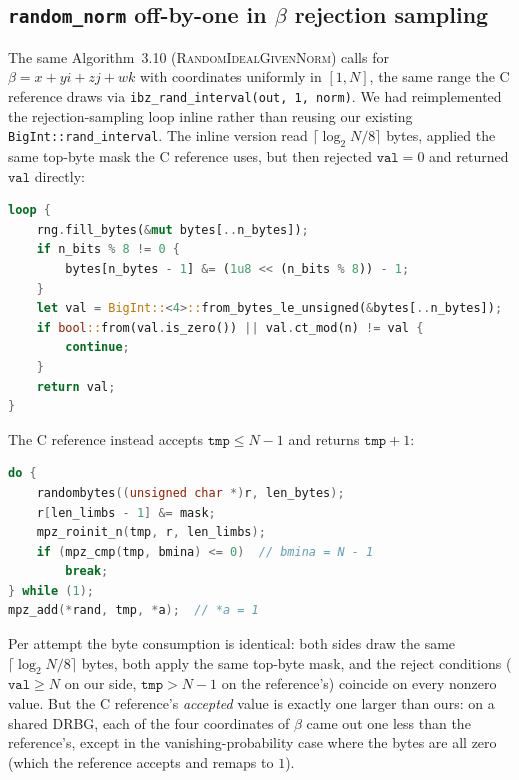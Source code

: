 \subsection{\texttt{random\_norm} off-by-one in $\beta$ rejection sampling}
\label{sec:bug-random-norm-off-by-one}

The same Algorithm~3.10 (\textsc{RandomIdealGivenNorm}) calls for
$\beta = x + yi + zj + wk$ with coordinates uniformly in
$[1, N]$, the same range the C reference draws via
\texttt{ibz\_rand\_interval(out, 1, norm)}.  We had reimplemented
the rejection-sampling loop inline rather than reusing our
existing \texttt{BigInt::rand\_interval}.  The inline version
read $\lceil \log_2 N / 8 \rceil$ bytes, applied the same top-byte
mask the C reference uses, but then rejected $\mathtt{val}=0$ and
returned $\mathtt{val}$ directly:
\begin{lstlisting}[language=Rust]
loop {
    rng.fill_bytes(&mut bytes[..n_bytes]);
    if n_bits % 8 != 0 {
        bytes[n_bytes - 1] &= (1u8 << (n_bits % 8)) - 1;
    }
    let val = BigInt::<4>::from_bytes_le_unsigned(&bytes[..n_bytes]);
    if bool::from(val.is_zero()) || val.ct_mod(n) != val {
        continue;
    }
    return val;
}
\end{lstlisting}
The C reference instead accepts $\mathtt{tmp} \le N - 1$ and
returns $\mathtt{tmp} + 1$:
\begin{lstlisting}[language=C]
do {
    randombytes((unsigned char *)r, len_bytes);
    r[len_limbs - 1] &= mask;
    mpz_roinit_n(tmp, r, len_limbs);
    if (mpz_cmp(tmp, bmina) <= 0)  // bmina = N - 1
        break;
} while (1);
mpz_add(*rand, tmp, *a);  // *a = 1
\end{lstlisting}
Per attempt the byte consumption is identical: both sides draw
the same $\lceil \log_2 N / 8 \rceil$ bytes, both apply the same
top-byte mask, and the reject conditions
($\mathtt{val} \ge N$ on our side, $\mathtt{tmp} > N - 1$ on the
reference's) coincide on every nonzero value.  But the C
reference's \emph{accepted} value is exactly one larger than
ours: on a shared DRBG, each of the four coordinates of $\beta$
came out one less than the reference's, except in the
vanishing-probability case where the bytes are all zero (which
the reference accepts and remaps to $1$).

